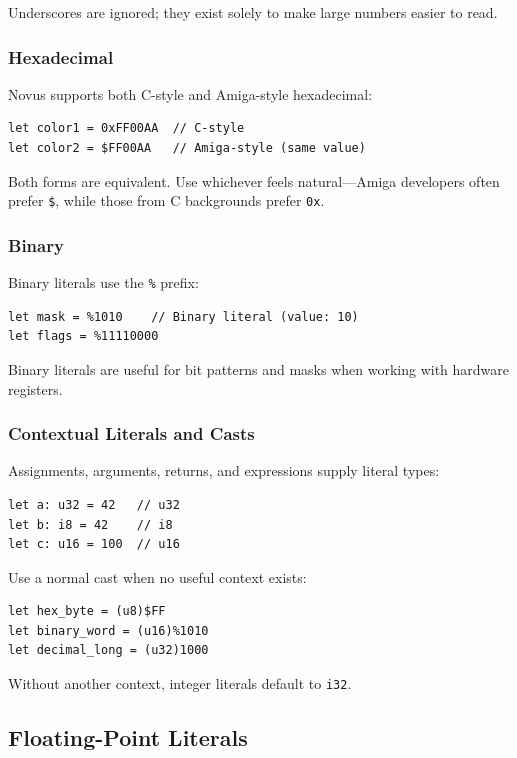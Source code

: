 Underscores are ignored; they exist solely to make large numbers easier to read.

\subsubsection{Hexadecimal}

Novus supports both C-style and Amiga-style hexadecimal:

\begin{lstlisting}
let color1 = 0xFF00AA  // C-style
let color2 = $FF00AA   // Amiga-style (same value)
\end{lstlisting}

Both forms are equivalent. Use whichever feels natural---Amiga developers often prefer \texttt{\$}, while those from C backgrounds prefer \texttt{0x}.

\subsubsection{Binary}

Binary literals use the \texttt{\%} prefix:

\begin{lstlisting}
let mask = %1010    // Binary literal (value: 10)
let flags = %11110000
\end{lstlisting}

Binary literals are useful for bit patterns and masks when working with hardware registers.

\subsubsection{Contextual Literals and Casts}

Assignments, arguments, returns, and expressions supply literal types:

\begin{lstlisting}
let a: u32 = 42   // u32
let b: i8 = 42    // i8
let c: u16 = 100  // u16
\end{lstlisting}

Use a normal cast when no useful context exists:

\begin{lstlisting}
let hex_byte = (u8)$FF
let binary_word = (u16)%1010
let decimal_long = (u32)1000
\end{lstlisting}

Without another context, integer literals default to \texttt{i32}.

\subsection{Floating-Point Literals}

